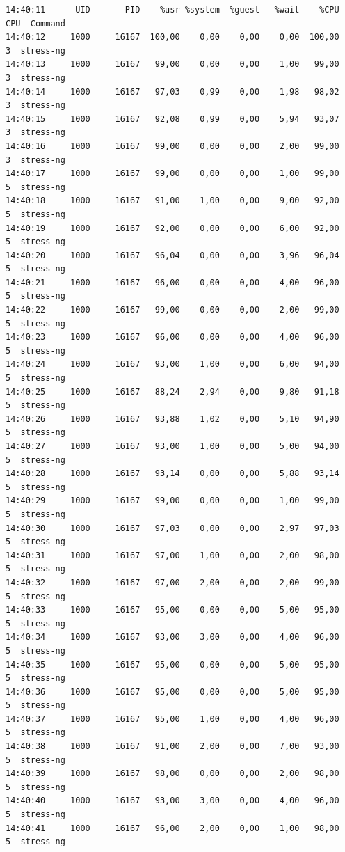 \begin{verbatim}
14:40:11      UID       PID    %usr %system  %guest   %wait    %CPU   CPU  Command
14:40:12     1000     16167  100,00    0,00    0,00    0,00  100,00     3  stress-ng
14:40:13     1000     16167   99,00    0,00    0,00    1,00   99,00     3  stress-ng
14:40:14     1000     16167   97,03    0,99    0,00    1,98   98,02     3  stress-ng
14:40:15     1000     16167   92,08    0,99    0,00    5,94   93,07     3  stress-ng
14:40:16     1000     16167   99,00    0,00    0,00    2,00   99,00     3  stress-ng
14:40:17     1000     16167   99,00    0,00    0,00    1,00   99,00     5  stress-ng
14:40:18     1000     16167   91,00    1,00    0,00    9,00   92,00     5  stress-ng
14:40:19     1000     16167   92,00    0,00    0,00    6,00   92,00     5  stress-ng
14:40:20     1000     16167   96,04    0,00    0,00    3,96   96,04     5  stress-ng
14:40:21     1000     16167   96,00    0,00    0,00    4,00   96,00     5  stress-ng
14:40:22     1000     16167   99,00    0,00    0,00    2,00   99,00     5  stress-ng
14:40:23     1000     16167   96,00    0,00    0,00    4,00   96,00     5  stress-ng
14:40:24     1000     16167   93,00    1,00    0,00    6,00   94,00     5  stress-ng
14:40:25     1000     16167   88,24    2,94    0,00    9,80   91,18     5  stress-ng
14:40:26     1000     16167   93,88    1,02    0,00    5,10   94,90     5  stress-ng
14:40:27     1000     16167   93,00    1,00    0,00    5,00   94,00     5  stress-ng
14:40:28     1000     16167   93,14    0,00    0,00    5,88   93,14     5  stress-ng
14:40:29     1000     16167   99,00    0,00    0,00    1,00   99,00     5  stress-ng
14:40:30     1000     16167   97,03    0,00    0,00    2,97   97,03     5  stress-ng
14:40:31     1000     16167   97,00    1,00    0,00    2,00   98,00     5  stress-ng
14:40:32     1000     16167   97,00    2,00    0,00    2,00   99,00     5  stress-ng
14:40:33     1000     16167   95,00    0,00    0,00    5,00   95,00     5  stress-ng
14:40:34     1000     16167   93,00    3,00    0,00    4,00   96,00     5  stress-ng
14:40:35     1000     16167   95,00    0,00    0,00    5,00   95,00     5  stress-ng
14:40:36     1000     16167   95,00    0,00    0,00    5,00   95,00     5  stress-ng
14:40:37     1000     16167   95,00    1,00    0,00    4,00   96,00     5  stress-ng
14:40:38     1000     16167   91,00    2,00    0,00    7,00   93,00     5  stress-ng
14:40:39     1000     16167   98,00    0,00    0,00    2,00   98,00     5  stress-ng
14:40:40     1000     16167   93,00    3,00    0,00    4,00   96,00     5  stress-ng
14:40:41     1000     16167   96,00    2,00    0,00    1,00   98,00     5  stress-ng

\end{verbatim}
